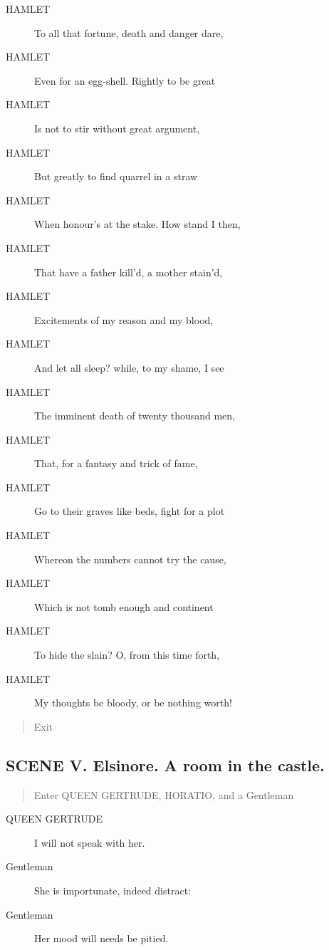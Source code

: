 \documentclass{article}
\begin{document}
\begin{description}
\item[HAMLET] To all that fortune, death and danger dare,
\item[HAMLET] Even for an egg-shell. Rightly to be great
\item[HAMLET] Is not to stir without great argument,
\item[HAMLET] But greatly to find quarrel in a straw
\item[HAMLET] When honour's at the stake. How stand I then,
\item[HAMLET] That have a father kill'd, a mother stain'd,
\item[HAMLET] Excitements of my reason and my blood,
\item[HAMLET] And let all sleep? while, to my shame, I see
\item[HAMLET] The imminent death of twenty thousand men,
\item[HAMLET] That, for a fantasy and trick of fame,
\item[HAMLET] Go to their graves like beds, fight for a plot
\item[HAMLET] Whereon the numbers cannot try the cause,
\item[HAMLET] Which is not tomb enough and continent
\item[HAMLET] To hide the slain? O, from this time forth,
\item[HAMLET] My thoughts be bloody, or be nothing worth!
\end{description}
          
\begin{quote}
Exit
\end{quote}
          
\subsection{SCENE V.  Elsinore. A room in the castle.}
          
\begin{quote}
Enter QUEEN GERTRUDE, HORATIO, and a Gentleman
\end{quote}
          
\begin{description}
            
\item[QUEEN GERTRUDE] I will not speak with her.
\end{description}
          
\begin{description}
            
\item[Gentleman] She is importunate, indeed distract:
\item[Gentleman] Her mood will needs be pitied.
\end{description}
          
\end{document}
